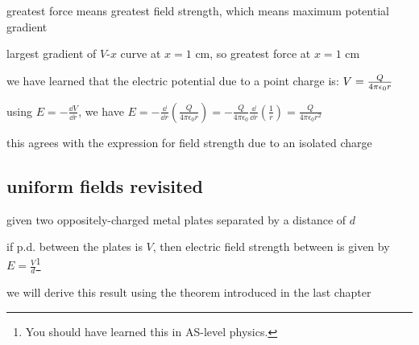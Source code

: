 \begin{soln} greatest force means greatest field strength, which means maximum potential gradient 

largest gradient of $V$-$x$ curve at $x=1$ cm, so greatest force at $x=1$ cm \end{soln}


we have learned that the electric potential due to a point charge is: $V = \frac{Q}{4\pi\epsilon_0 r}$
	
using $E = -\frac{\dd V}{\dd r}$, we have $E = -\frac{\dd}{\dd r}\left( \frac{Q}{4\pi\epsilon_0r} \right) = -\frac{Q}{4\pi\epsilon_0}\frac{\dd}{\dd r}\left(\frac{1}{r}\right) = \frac{Q}{4\pi\epsilon_0r^2}$

this agrees with the expression for field strength due to an isolated charge \eoe






\subsection*{uniform fields revisited}

given two oppositely-charged metal plates separated by a distance of $d$

if p.d. between the plates is $V$, then electric field strength between is given by $E = \frac{V}{d}$\footnote{You should have learned this in AS-level physics.}

we will derive this result using the theorem introduced in the last chapter

